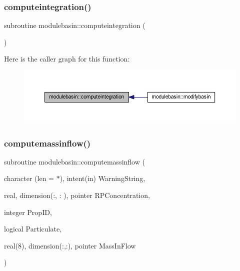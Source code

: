 \subsubsection{\texorpdfstring{computeintegration()}{computeintegration()}}
{\footnotesize\ttfamily subroutine modulebasin\+::computeintegration (\begin{DoxyParamCaption}{ }\end{DoxyParamCaption})\hspace{0.3cm}{\ttfamily [private]}}

Here is the caller graph for this function\+:\nopagebreak
\begin{figure}[H]
\begin{center}
\leavevmode
\includegraphics[width=350pt]{namespacemodulebasin_a9ef4a0de552e03dfcc7dc780e6162af7_icgraph}
\end{center}
\end{figure}
\mbox{\label{namespacemodulebasin_a106653309e017391895ef068b14bfdc2}} 
\subsubsection{\texorpdfstring{computemassinflow()}{computemassinflow()}}
{\footnotesize\ttfamily subroutine modulebasin\+::computemassinflow (\begin{DoxyParamCaption}\item[{character (len = $\ast$), intent(in)}]{Warning\+String,  }\item[{real, dimension(\+:, \+:   ), pointer}]{R\+P\+Concentration,  }\item[{integer}]{Prop\+ID,  }\item[{logical}]{Particulate,  }\item[{real(8), dimension(\+:,\+:), pointer}]{Mass\+In\+Flow }\end{DoxyParamCaption})\hspace{0.3cm}{\ttfamily [private]}}

